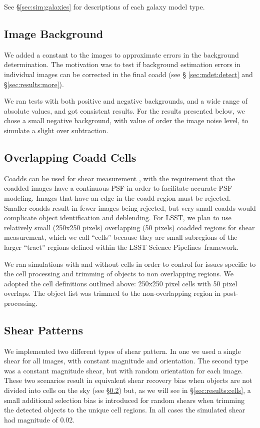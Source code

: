 \documentclass[twocolumn,twocolappendix,astrosym]{openjournal}
\newcommand{\dm}{LSST Science Pipelines}
\newcommand{\mshear}{0.02}
\begin{document}
See \S \ref{sec:sim:galaxies} for descriptions of each galaxy model type.

\subsection{Image Background} \label{sec:sim:bgerr}

We added a constant to the images to approximate errors in the background
determination.  The motivation was to test if background estimation errors in
individual images can be corrected in the final coadd (see \S
\ref{sec:mdet:detect} and \S \ref{sec:results:more}).

We ran tests with both positive and negative backgrounds, and a wide range of
absolute values, and got consistent results.  For the results presented below,
we chose a small negative background, with value of order the image noise
level, to simulate a slight over subtraction.

\subsection{Overlapping Coadd Cells} \label{sec:sim:cells}

Coadds can be used for shear measurement \citep{ArmstrongCoadd}, with the
requirement that the coadded images have a continuous PSF in order to
facilitate accurate PSF modeling.  Images that have an edge in the coadd region
must be rejected.  Smaller coadds result in fewer images being rejected, but
very small coadds would complicate object identification and deblending.  For
LSST, we plan to use relatively small (250x250 pixels) overlapping (50 pixels)
coadded regions for shear measurement, which we call ``cells'' because they are
small subregions of the larger ``tract'' regions defined within the \dm\
framework.

We ran simulations with and without cells in order to control for issues
specific to the cell processing and trimming of objects to non overlapping
regions.  We adopted the cell definitions outlined above: 250x250 pixel cells
with 50 pixel overlaps. The object list was trimmed to the non-overlapping
region in post-processing.

\subsection{Shear Patterns} \label{sec:sim:shears}

We implemented two different types of shear pattern.  In one we used a single
shear for all images, with constant magnitude and orientation.  The second type
was a constant magnitude shear, but with random orientation for each image.
These two scenarios result in equivalent shear recovery bias when objects are
not divided into cells on the sky (see \S \ref{sec:sim:cells}) but, as we will
see in \S \ref{sec:results:cells}, a small additional selection bias is
introduced for random shears when trimming the detected objects to the unique
cell regions.  In all cases the simulated shear had magnitude of \mshear.
\end{document}
